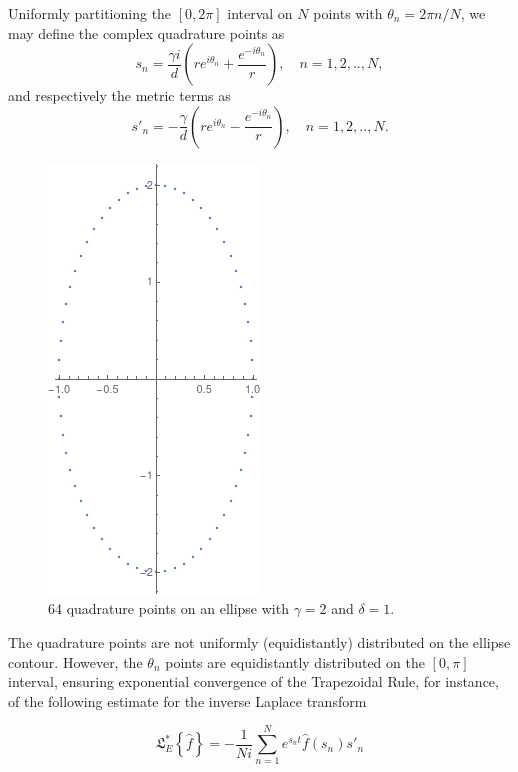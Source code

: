 \documentclass[10pt,a4paper,final]{article}
\begin{document}
Uniformly partitioning the $[0,2\pi]$ interval on $N$ points with $\theta_n=2\pi n/N$, we may define the complex quadrature points as
\begin{equation}
s_n=\frac{\gamma i}{d}\left(re^{i\theta_n}+\frac{e^{-i\theta_n}}{r}\right), \quad n=1,2,..,N,
\end{equation}
and respectively the metric terms as
\begin{equation}
s'_n=-\frac{\gamma}{d}\left(re^{i\theta_n}-\frac{e^{-i\theta_n}}{r}\right),  \quad n=1,2,..,N.
\end{equation}

\begin{figure}[h!]
\centering
\includegraphics[scale=0.4]{ellipse-quadpoints64}
\caption{64 quadrature points on an ellipse with $\gamma=2$ and $\delta=1$.}
\end{figure}

The quadrature points are not uniformly (equidistantly) distributed on the ellipse contour. However, the $\theta_n$ points are equidistantly distributed on the $[0,\pi]$ interval, ensuring exponential convergence of the Trapezoidal Rule, for instance, of the following estimate for the inverse Laplace transform

\begin{equation}\label{milt_ellipse}
{ \mathfrak{ L } }^{ * }_E\left\{ \widehat { f }  \right\}=-\frac { 1 }{  N i} \sum _{ n=1 }^{ N }{ { e }^{ { s }_{ n }t }\widehat { f } \left( { s }_{ n } \right) { s }'_{ n } }
\end{equation}
\end{document}
